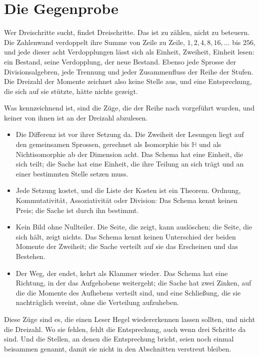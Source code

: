 \documentclass[11pt,a4paper]{article}
\newcommand{\HH}{\mathbb H}
\begin{document}
\section{Die Gegenprobe}
\label{sec:gegenprobe}

Wer Dreischritte sucht, findet Dreischritte. Das ist zu zählen, nicht zu beteuern. Die Zahlenwand verdoppelt ihre Summe von Zeile zu Zeile, $1,2,4,8,16,\ldots$ bis $256$, und jede dieser acht Verdopplungen lässt sich als Einheit, Zweiheit, Einheit lesen: ein Bestand, seine Verdopplung, der neue Bestand. Ebenso jede Sprosse der Divisionsalgebren, jede Trennung und jeder Zusammenfluss der Reihe der Stufen. Die Dreizahl der Momente zeichnet also keine Stelle aus, und eine Entsprechung, die sich auf sie stützte, hätte nichts gezeigt.

Was kennzeichnend ist, sind die Züge, die der Reihe nach vorgeführt wurden, und keiner von ihnen ist an der Dreizahl abzulesen.

\begin{itemize}[leftmargin=1.6em,itemsep=2pt]
\item Die Differenz ist vor ihrer Setzung da. Die Zweiheit der Lesungen liegt auf den gemeinsamen Sprossen, gerechnet als Isomorphie bis $\HH$ und als Nichtisomorphie ab der Dimension acht. Das Schema hat eine Einheit, die sich teilt; die Sache hat eine Einheit, die ihre Teilung an sich trägt und an einer bestimmten Stelle setzen muss.
\item Jede Setzung kostet, und die Liste der Kosten ist ein Theorem. Ordnung, Kommutativität, Assoziativität oder Division: Das Schema kennt keinen Preis; die Sache ist durch ihn bestimmt.
\item Kein Bild ohne Nullteiler. Die Seite, die zeigt, kann auslöschen; die Seite, die sich hält, zeigt nichts. Das Schema kennt keinen Unterschied der beiden Momente der Zweiheit; die Sache verteilt auf sie das Erscheinen und das Bestehen.
\item Der Weg, der endet, kehrt als Klammer wieder. Das Schema hat eine Richtung, in der das Aufgehobene weitergeht; die Sache hat zwei Zinken, auf die die Momente des Aufhebens verteilt sind, und eine Schließung, die sie nachträglich vereint, ohne die Verteilung aufzuheben.
\end{itemize}

Diese Züge sind es, die einen Leser Hegel wiedererkennen lassen sollten, und nicht die Dreizahl. Wo sie fehlen, fehlt die Entsprechung, auch wenn drei Schritte da sind. Und die Stellen, an denen die Entsprechung bricht, seien noch einmal beisammen genannt, damit sie nicht in den Abschnitten verstreut bleiben.
\end{document}
